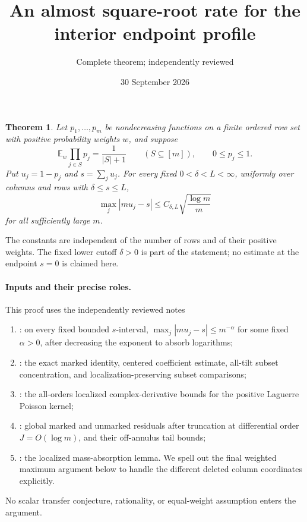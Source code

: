 \documentclass[11pt]{article}
\title{An almost square-root rate for the interior endpoint profile}
\author{Complete theorem; independently reviewed}
\date{30 September 2026}
\newtheorem{theorem}{Theorem}\newtheorem{lemma}{Lemma}
\newcommand{\E}{\mathbb E}
\begin{document}
\maketitle

\begin{theorem}\label{main}
Let $p_1,\ldots,p_m$ be nondecreasing functions on a finite ordered
row set with positive probability weights $w$, and suppose
\[
 \E_w\prod_{j\in S}p_j=\frac1{|S|+1}\qquad(S\subseteq[m]),
 \qquad 0\le p_j\le1.
\]
Put $u_j=1-p_j$ and $s=\sum_j u_j$. For every fixed
$0<\delta<L<\infty$, uniformly over columns and rows with
$\delta\le s\le L$,
\[
 \max_j|m u_j-s|\le C_{\delta,L}\sqrt{\frac{\log m}{m}}
\]
for all sufficiently large $m$.
\end{theorem}

The constants are independent of the number of rows and of their
positive weights. The fixed lower cutoff $\delta>0$ is part of the
statement; no estimate at the endpoint $s=0$ is claimed here.

\paragraph{Inputs and their precise roles.}
This proof uses the independently reviewed notes
\begin{enumerate}
\item {}:
 on every fixed bounded $s$-interval, $\max_j|m u_j-s|\le m^{-\alpha}$
 for some fixed $\alpha>0$, after decreasing the exponent to absorb
 logarithms;
\item {}: the exact marked
 identity, centered coefficient estimate, all-tilt subset
 concentration, and localization-preserving subset comparisons;
\item {}: the
 all-orders localized complex-derivative bounds for the positive
 Laguerre Poisson kernel;
\item {}:
 global marked and unmarked residuals after truncation at differential
 order $J=O(\log m)$, and their off-annulus tail bounds;
\item {}:
 the localized mass-absorption lemma. We spell out the final
 weighted maximum argument below to handle the different deleted
 column coordinates explicitly.
\end{enumerate}
No scalar transfer conjecture, rationality, or equal-weight assumption
enters the argument.
\end{document}
